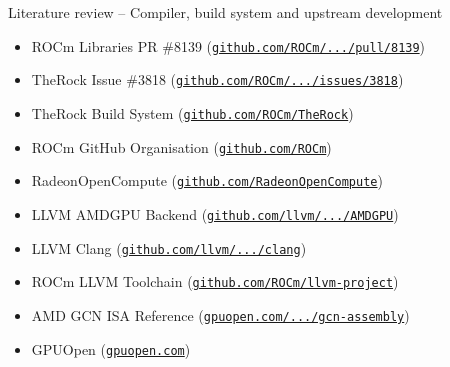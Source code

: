 \documentclass[aspectratio=43,9pt]{beamer}
\begin{document}
\begin{frame}{Literature review -- Compiler, build system and upstream development}
\begin{itemize}
    \item ROCm Libraries PR \#8139 (\href{https://github.com/ROCm/rocm-libraries/pull/8139}{\texttt{github.com/ROCm/.../pull/8139}})
    \item TheRock Issue \#3818 (\href{https://github.com/ROCm/TheRock/issues/3818}{\texttt{github.com/ROCm/.../issues/3818}})
    \item TheRock Build System (\href{https://github.com/ROCm/TheRock}{\texttt{github.com/ROCm/TheRock}})
    \item ROCm GitHub Organisation (\href{https://github.com/ROCm}{\texttt{github.com/ROCm}})
    \item RadeonOpenCompute (\href{https://github.com/RadeonOpenCompute}{\texttt{github.com/RadeonOpenCompute}})
    \item LLVM AMDGPU Backend (\href{https://github.com/llvm/llvm-project/tree/main/llvm/lib/Target/AMDGPU}{\texttt{github.com/llvm/.../AMDGPU}})
    \item LLVM Clang (\href{https://github.com/llvm/llvm-project/tree/main/clang}{\texttt{github.com/llvm/.../clang}})
    \item ROCm LLVM Toolchain (\href{https://github.com/ROCm/llvm-project}{\texttt{github.com/ROCm/llvm-project}})
    \item AMD GCN ISA Reference (\href{https://gpuopen.com/learn/amd-gcn-assembly-cross-lane-operations/}{\texttt{gpuopen.com/.../gcn-assembly}})
    \item GPUOpen (\href{https://gpuopen.com/}{\texttt{gpuopen.com}})
\end{itemize}
\end{frame}
\end{document}
